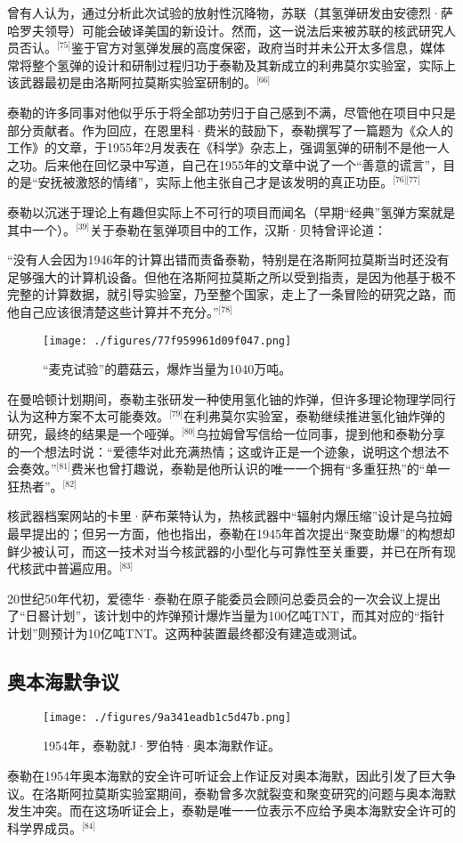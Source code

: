 曾有人认为，通过分析此次试验的放射性沉降物，苏联（其氢弹研发由安德烈·萨哈罗夫领导）可能会破译美国的新设计。然而，这一说法后来被苏联的核武研究人员否认。\(^\text{[75]}\)鉴于官方对氢弹发展的高度保密，政府当时并未公开太多信息，媒体常将整个氢弹的设计和研制过程归功于泰勒及其新成立的利弗莫尔实验室，实际上该武器最初是由洛斯阿拉莫斯实验室研制的。\(^\text{[66]}\)

泰勒的许多同事对他似乎乐于将全部功劳归于自己感到不满，尽管他在项目中只是部分贡献者。作为回应，在恩里科·费米的鼓励下，泰勒撰写了一篇题为《众人的工作》的文章，于1955年2月发表在《科学》杂志上，强调氢弹的研制不是他一人之功。后来他在回忆录中写道，自己在1955年的文章中说了一个“善意的谎言”，目的是“安抚被激怒的情绪”，实际上他主张自己才是该发明的真正功臣。\(^\text{[76][77]}\)

泰勒以沉迷于理论上有趣但实际上不可行的项目而闻名（早期“经典”氢弹方案就是其中一个）。\(^\text{[39]}\)关于泰勒在氢弹项目中的工作，汉斯·贝特曾评论道：

“没有人会因为1946年的计算出错而责备泰勒，特别是在洛斯阿拉莫斯当时还没有足够强大的计算机设备。但他在洛斯阿拉莫斯之所以受到指责，是因为他基于极不完整的计算数据，就引导实验室，乃至整个国家，走上了一条冒险的研究之路，而他自己应该很清楚这些计算并不充分。”\(^\text{[78]}\)
\begin{figure}[ht]
\centering
\texttt{[image: ./figures/77f959961d09f047.png]}
\caption{“麦克试验”的蘑菇云，爆炸当量为1040万吨。} \label{fig_ADHTL_10}
\end{figure}
在曼哈顿计划期间，泰勒主张研发一种使用氢化铀的炸弹，但许多理论物理学同行认为这种方案不太可能奏效。\(^\text{[79]}\)在利弗莫尔实验室，泰勒继续推进氢化铀炸弹的研究，最终的结果是一个哑弹。\(^\text{[80]}\)乌拉姆曾写信给一位同事，提到他和泰勒分享的一个想法时说：“爱德华对此充满热情；这或许正是一个迹象，说明这个想法不会奏效。”\(^\text{[81]}\)费米也曾打趣说，泰勒是他所认识的唯一一个拥有“多重狂热”的“单一狂热者”。\(^\text{[82]}\)

核武器档案网站的卡里·萨布莱特认为，热核武器中“辐射内爆压缩”设计是乌拉姆最早提出的；但另一方面，他也指出，泰勒在1945年首次提出“聚变助爆”的构想却鲜少被认可，而这一技术对当今核武器的小型化与可靠性至关重要，并已在所有现代核武中普遍应用。\(^\text{[83]}\)

20世纪50年代初，爱德华·泰勒在原子能委员会顾问总委员会的一次会议上提出了“日晷计划”，该计划中的炸弹预计爆炸当量为100亿吨TNT，而其对应的“指针计划”则预计为10亿吨TNT。这两种装置最终都没有建造或测试。
\subsection{奥本海默争议}
\begin{figure}[ht]
\centering
\texttt{[image: ./figures/9a341eadb1c5d47b.png]}
\caption{1954年，泰勒就J·罗伯特·奥本海默作证。} \label{fig_ADHTL_13}
\end{figure}
泰勒在1954年奥本海默的安全许可听证会上作证反对奥本海默，因此引发了巨大争议。在洛斯阿拉莫斯实验室期间，泰勒曾多次就裂变和聚变研究的问题与奥本海默发生冲突。而在这场听证会上，泰勒是唯一一位表示不应给予奥本海默安全许可的科学界成员。\(^\text{[84]}\)

